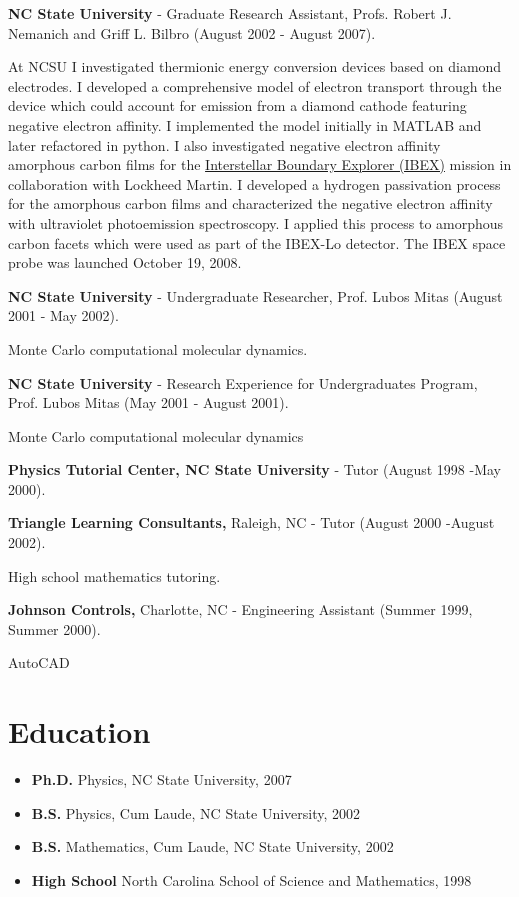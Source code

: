 \textbf{NC State University} - Graduate Research Assistant, Profs.
Robert J. Nemanich and Griff L. Bilbro (August 2002 - August 2007).

At NCSU I investigated thermionic energy conversion devices based on
diamond electrodes. I developed a comprehensive model of electron
transport through the device which could account for emission from a
diamond cathode featuring negative electron affinity. I implemented the
model initially in MATLAB and later refactored in python. I also
investigated negative electron affinity amorphous carbon films for the
\href{http://www.nasa.gov/mission_pages/ibex/index.html}{Interstellar
Boundary Explorer (IBEX)} mission in collaboration with Lockheed Martin.
I developed a hydrogen passivation process for the amorphous carbon
films and characterized the negative electron affinity with ultraviolet
photoemission spectroscopy. I applied this process to amorphous carbon
facets which were used as part of the IBEX-Lo detector. The IBEX space
probe was launched October 19, 2008.

\textbf{NC State University} - Undergraduate Researcher, Prof. Lubos
Mitas (August 2001 - May 2002).

Monte Carlo computational molecular dynamics.

\textbf{NC State University} - Research Experience for Undergraduates
Program, Prof. Lubos Mitas (May 2001 - August 2001).

Monte Carlo computational molecular dynamics

\textbf{Physics Tutorial Center, NC State University} - Tutor (August
1998 -May 2000).

\textbf{Triangle Learning Consultants,} Raleigh, NC - Tutor (August 2000
-August 2002).

High school mathematics tutoring.

\textbf{Johnson Controls,} Charlotte, NC - Engineering Assistant (Summer
1999, Summer 2000).

AutoCAD

\section{Education}

\begin{itemize}
\item
  \textbf{Ph.D.} Physics, NC State University, 2007
\item
  \textbf{B.S.} Physics, Cum Laude, NC State University, 2002
\item
  \textbf{B.S.} Mathematics, Cum Laude, NC State University, 2002
\item
  \textbf{High School} North Carolina School of Science and Mathematics,
  1998
\end{itemize}

